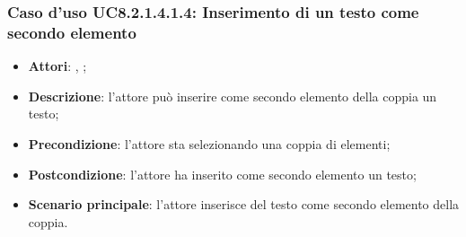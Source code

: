 		\subsubsection{Caso d'uso UC8.2.1.4.1.4: Inserimento di un testo come secondo elemento}
		\label{UC8.2.1.4.1.4}
		\begin{itemize}
			\item \textbf{Attori}: \uau, \uaupro;
			\item \textbf{Descrizione}: l'attore può inserire come secondo elemento della coppia un testo;
			\item \textbf{Precondizione}: l'attore sta selezionando una coppia di elementi;
			\item \textbf{Postcondizione}: l'attore ha inserito come secondo elemento un testo;
			\item \textbf{Scenario principale}: l'attore inserisce del testo come secondo elemento della coppia.
		\end{itemize}
	

